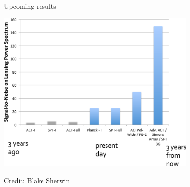 \documentclass[table]{beamer}
\begin{document}
\begin{frame}{Upcoming results}
	\begin{center}
		\includegraphics[height=8cm]{plots/cmb_lensing_past_future_blake.png}

		\vspace{-0.5cm}
		{\footnotesize Credit: Blake Sherwin}
	\end{center}
\end{frame}
\end{document}
